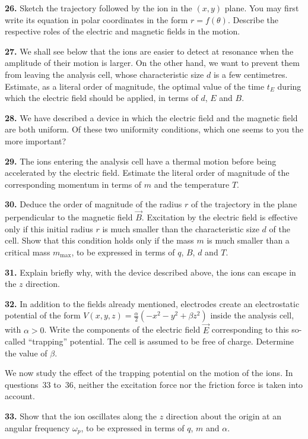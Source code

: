 \documentclass[11pt,a4paper]{article}
\newcommand{\q}[1]{\par\medskip\noindent\textbf{#1.}\enspace}
\newcommand{\vv}[1]{\vec{#1}}
\begin{document}
\q{26} Sketch the trajectory followed by the ion in the $(x,y)$ plane. You may first write its
equation in polar coordinates in the form $r = f(\theta)$. Describe the respective roles of the
electric and magnetic fields in the motion.

\q{27} We shall see below that the ions are easier to detect at resonance when the amplitude of
their motion is larger. On the other hand, we want to prevent them from leaving the analysis
cell, whose characteristic size $d$ is a few centimetres. Estimate, as a literal order of
magnitude, the optimal value of the time $t_E$ during which the electric field should be
applied, in terms of $d$, $E$ and $B$.

\q{28} We have described a device in which the electric field and the magnetic field are both
uniform. Of these two uniformity conditions, which one seems to you the more important?

\q{29} The ions entering the analysis cell have a thermal motion before being accelerated by
the electric field. Estimate the literal order of magnitude of the corresponding momentum in
terms of $m$ and the temperature $T$.

\q{30} Deduce the order of magnitude of the radius $r$ of the trajectory in the plane
perpendicular to the magnetic field $\vv B$. Excitation by the electric field is effective
only if this initial radius $r$ is much smaller than the characteristic size $d$ of the cell.
Show that this condition holds only if the mass $m$ is much smaller than a critical mass
$m_{\max}$, to be expressed in terms of $q$, $B$, $d$ and $T$.


\q{31} Explain briefly why, with the device described above, the ions can escape in the $z$
direction.

\q{32} In addition to the fields already mentioned, electrodes create an electrostatic
potential of the form $V(x,y,z) = \frac\alpha2(-x^2 - y^2 + \beta z^2)$ inside the analysis
cell, with $\alpha > 0$. Write the components of the electric field $\vv E$ corresponding to
this so-called ``trapping'' potential. The cell is assumed to be free of charge. Determine the
value of $\beta$.

We now study the effect of the trapping potential on the motion of the ions. In questions~33
to~36, neither the excitation force nor the friction force is taken into account.

\q{33} Show that the ion oscillates along the $z$ direction about the origin at an angular
frequency $\omega_p$, to be expressed in terms of $q$, $m$ and $\alpha$.
\end{document}
